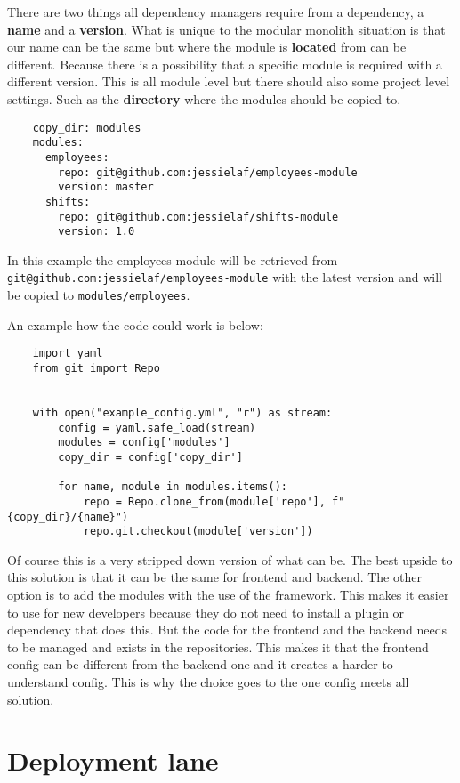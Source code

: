 There are two things all dependency managers require from a dependency, a \textbf{name} and a \textbf{version}. What is unique to the modular monolith situation is that our name can be the same but where the module is \textbf{located} from can be different. Because there is a possibility that a specific module is required with a different version. This is all module level but there should also some project level settings. Such as the \textbf{directory} where the modules should be copied to.

\begin{verbatim}
    copy_dir: modules
    modules:
      employees:
        repo: git@github.com:jessielaf/employees-module
        version: master
      shifts:
        repo: git@github.com:jessielaf/shifts-module
        version: 1.0
\end{verbatim}

In this example the employees module will be retrieved from \texttt{git@github.com:jessielaf/employees-module} with the latest version and will be copied to \texttt{modules/employees}.

An example how the code could work is below:
\begin{verbatim}
    import yaml
    from git import Repo


    with open("example_config.yml", "r") as stream:
        config = yaml.safe_load(stream)
        modules = config['modules']
        copy_dir = config['copy_dir']

        for name, module in modules.items():
            repo = Repo.clone_from(module['repo'], f"{copy_dir}/{name}")
            repo.git.checkout(module['version'])
\end{verbatim}

Of course this is a very stripped down version of what can be. The best upside to this solution is that it can be the same for frontend and backend. The other option is to add the modules with the use of the framework. This makes it easier to use for new developers because they do not need to install a plugin or dependency that does this. But the code for the frontend and the backend needs to be managed and exists in the repositories. This makes it that the frontend config can be different from the backend one and it creates a harder to understand config. This is why the choice goes to the one config meets all solution.

\section{Deployment lane}

